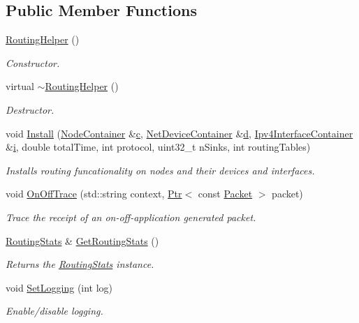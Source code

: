 \subsection*{Public Member Functions}
\begin{DoxyCompactItemize}
\item 
\hyperlink{classRoutingHelper_a597fb8ea45b0e9f8613274cf70db1d2b}{Routing\+Helper} ()
\begin{DoxyCompactList}\small\item\em Constructor. \end{DoxyCompactList}\item 
virtual \hyperlink{classRoutingHelper_a735c4a317a38ecdbc34897cc00f4df0e}{$\sim$\+Routing\+Helper} ()
\begin{DoxyCompactList}\small\item\em Destructor. \end{DoxyCompactList}\item 
void \hyperlink{classRoutingHelper_aaf78f59b3e8259f18029a594acfc01b6}{Install} (\hyperlink{classns3_1_1NodeContainer}{Node\+Container} \&\hyperlink{mmwave_2model_2fading-traces_2fading__trace__generator_8m_ae0323a9039add2978bf5b49550572c7c}{c}, \hyperlink{classns3_1_1NetDeviceContainer}{Net\+Device\+Container} \&\hyperlink{lte__pathloss_8m_a1aabac6d068eef6a7bad3fdf50a05cc8}{d}, \hyperlink{classns3_1_1Ipv4InterfaceContainer}{Ipv4\+Interface\+Container} \&\hyperlink{lte__uplink__power__control_8m_a6f6ccfcf58b31cb6412107d9d5281426}{i}, double total\+Time, int protocol, uint32\+\_\+t n\+Sinks, int routing\+Tables)
\begin{DoxyCompactList}\small\item\em Installs routing funcationality on nodes and their devices and interfaces. \end{DoxyCompactList}\item 
void \hyperlink{classRoutingHelper_afb001c77157c607712f5652c44a94423}{On\+Off\+Trace} (std\+::string context, \hyperlink{classns3_1_1Ptr}{Ptr}$<$ const \hyperlink{classns3_1_1Packet}{Packet} $>$ packet)
\begin{DoxyCompactList}\small\item\em Trace the receipt of an on-\/off-\/application generated packet. \end{DoxyCompactList}\item 
\hyperlink{classRoutingStats}{Routing\+Stats} \& \hyperlink{classRoutingHelper_ae3bfcf80989af6e77fa131d5787302c5}{Get\+Routing\+Stats} ()
\begin{DoxyCompactList}\small\item\em Returns the \hyperlink{classRoutingStats}{Routing\+Stats} instance. \end{DoxyCompactList}\item 
void \hyperlink{classRoutingHelper_a14fae09edb67bdac9dd513da38a4c669}{Set\+Logging} (int log)
\begin{DoxyCompactList}\small\item\em Enable/disable logging. \end{DoxyCompactList}\end{DoxyCompactItemize}
